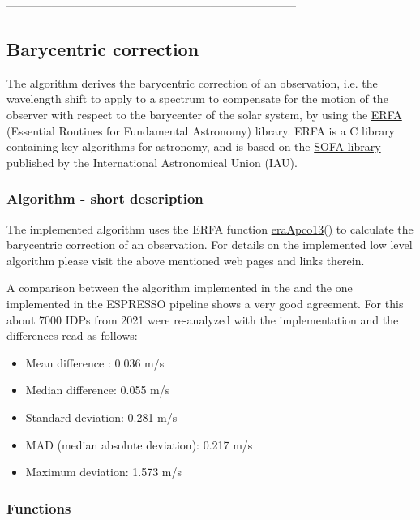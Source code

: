 -----------------------------------------------------------------------------
\subsection{Barycentric correction}
\label{sec:algorithms:barycorr:main}

The algorithm derives the barycentric correction of an observation,
i.e. the wavelength shift to apply to a spectrum to compensate for the
motion of the observer with respect to the barycenter of the solar
system, by using the \href{https://github.com/liberfa/erfa}{ERFA}
(Essential Routines for Fundamental Astronomy) library. ERFA is a C
library containing key algorithms for astronomy, and is based on the
\href{http://www.iausofa.org}{SOFA library} published by the
International Astronomical Union (IAU). \\

\subsubsection{Algorithm - short description}
\label{sec:algorithms:barycorr:algo}

The implemented algorithm uses the ERFA function
\href{https://github.com/liberfa/erfa/blob/master/src/apco13.c}{eraApco13()}
to calculate the barycentric correction of an observation. For details
on the implemented low level algorithm please visit the above
mentioned web pages and links therein.

A comparison between the algorithm implemented in the \HDRL and the
one implemented in the ESPRESSO pipeline shows a very good agreement.
For this about 7000 IDPs from 2021 were re-analyzed with the \HDRL
implementation and the differences read as follows:
\begin{itemize}
    \item Mean difference : 0.036 m/s
    \item Median difference: 0.055 m/s
    \item Standard deviation: 0.281 m/s
    \item MAD (median absolute deviation): 0.217 m/s
    \item Maximum deviation: 1.573 m/s
\end{itemize}

\subsubsection{Functions}
\label{sec:algorithms:barycorr:functions}

